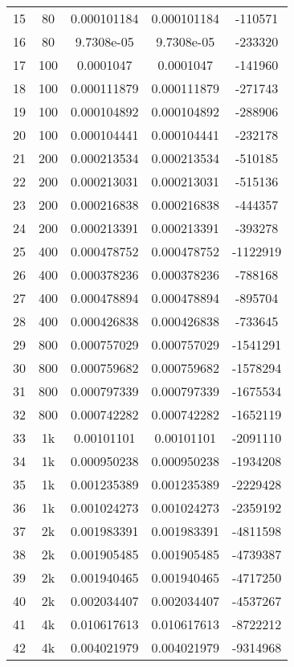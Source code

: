 \begin{center}
\begin{longtable}{|c|c|c|c|c|}
		15 & 80 & 0.000101184 & 0.000101184 & -110571\\
		16 & 80 & 9.7308e-05 & 9.7308e-05 & -233320\\
		\hline
		17 & 100 & 0.0001047 & 0.0001047 & -141960\\
		18 & 100 & 0.000111879 & 0.000111879 & -271743\\
		19 & 100 & 0.000104892 & 0.000104892 & -288906\\
		20 & 100 & 0.000104441 & 0.000104441 & -232178\\
		\hline
		21 & 200 & 0.000213534 & 0.000213534 & -510185\\
		22 & 200 & 0.000213031 & 0.000213031 & -515136\\
		23 & 200 & 0.000216838 & 0.000216838 & -444357\\
		24 & 200 & 0.000213391 & 0.000213391 & -393278\\
		\hline
		25 & 400 & 0.000478752 & 0.000478752 & -1122919\\
		26 & 400 & 0.000378236 & 0.000378236 & -788168\\
		27 & 400 & 0.000478894 & 0.000478894 & -895704\\
		28 & 400 & 0.000426838 & 0.000426838 & -733645\\
		\hline
		29 & 800 & 0.000757029 & 0.000757029 & -1541291\\
		30 & 800 & 0.000759682 & 0.000759682 & -1578294\\
		31 & 800 & 0.000797339 & 0.000797339 & -1675534\\
		32 & 800 & 0.000742282 & 0.000742282 & -1652119\\
		\hline
		33 & 1k & 0.00101101 & 0.00101101 & -2091110\\
		34 & 1k & 0.000950238 & 0.000950238 & -1934208\\
		35 & 1k & 0.001235389 & 0.001235389 & -2229428\\
		36 & 1k & 0.001024273 & 0.001024273 & -2359192\\
		\hline
		37 & 2k & 0.001983391 & 0.001983391 & -4811598\\
		38 & 2k & 0.001905485 & 0.001905485 & -4739387\\
		39 & 2k & 0.001940465 & 0.001940465 & -4717250\\
		40 & 2k & 0.002034407 & 0.002034407 & -4537267\\
		\hline
		41 & 4k & 0.010617613 & 0.010617613 & -8722212\\
		42 & 4k & 0.004021979 & 0.004021979 & -9314968\\

\end{longtable}
\end{center}
